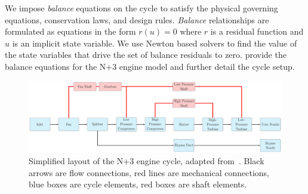 \documentclass[conf]{new-aiaa}
\begin{document}
We impose \emph{balance} equations on the cycle to satisfy the physical governing equations, conservation laws, and design rules.
\emph{Balance} relationships are formulated as equations in the form $r(u)=0$ where $r$ is a residual function and $u$ is an implicit state variable.
We use Newton based solvers to find the value of the state variables that drive the set of balance residuals to zero.
\citeauthor{Hendricks2019} provide the balance equations for the N+3 engine model and further detail the cycle setup.

\begin{figure}[hbt!]
    \centering
    \includegraphics[width=1.0\textwidth]{N3_cycle.pdf}
    \caption{
        Simplified layout of the N+3 engine cycle, adapted from~\citet{Hendricks2019}.
        Black arrows are flow connections, red lines are mechanical connections, blue boxes are cycle elements, red boxes are shaft elements.
    }
    \label{fig:N3_original}
\end{figure}

\end{document}
